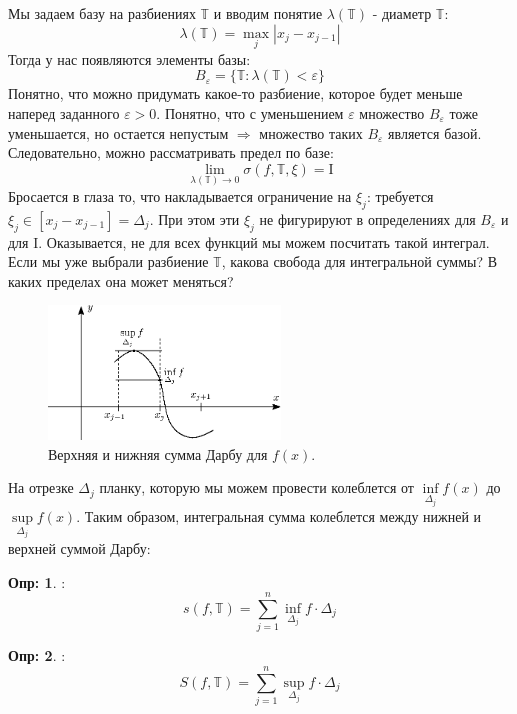 \documentclass[12pt]{article}
\newcommand{\MTB}{\mathbb{T}}
\newcommand{\MI}{\mathrm{I}}
\newcommand{\VE}{\varepsilon}
\theoremstyle{definition}
\newtheorem{defn}{Опр:}
\newcommand{\ddsum}[2]{\displaystyle\sum\limits_{#1}^{#2}}
\begin{document}
Мы задаем базу на разбиениях $\MTB$ и вводим понятие $\lambda(\MTB)$ - диаметр $\MTB$:
$$
	\lambda(\MTB) = \max\limits_{j}|x_j - x_{j-1}|
$$
Тогда у нас появляются элементы базы:
$$
	B_\VE = \{\MTB \colon \lambda{(\MTB)} < \VE\}
$$
Понятно, что можно придумать какое-то разбиение, которое будет меньше наперед заданного $\VE > 0$. Понятно, что с уменьшением $\VE$ множество $B_{\VE}$ тоже уменьшается, но остается непустым $\Rightarrow$ множество таких $B_{\VE}$ является базой. Следовательно, можно рассматривать предел по базе:
$$
	\lim\limits_{\lambda(\MTB) \to 0} \sigma(f,\MTB,\xi) = \MI
$$
Бросается в глаза то, что накладывается ограничение на $\xi_j$: требуется $\xi_j \in [x_{j} - x_{j-1}] = \Delta_j$. При этом эти $\xi_j$ не фигурируют в определениях для $B_\VE$ и для $\MI$. Оказывается, не для всех функций мы можем посчитать такой интеграл. Если мы уже выбрали разбиение $\MTB$, какова свобода для интегральной суммы? В каких пределах она может меняться?
\begin{figure}[H]
	\centering
	\includegraphics[width=0.55\textwidth]{MA2S8_2.eps}
	\caption{Верхняя и нижняя сумма Дарбу для $f(x)$.}
	\label{8_2}
\end{figure}
На отрезке $\Delta_j$ планку, которую мы можем провести колеблется от $\inf\limits_{\Delta_j}f(x)$ до $\sup\limits_{\Delta_j}f(x)$. Таким образом, интегральная сумма колеблется между нижней и верхней суммой Дарбу:
\begin{defn}
	:
	$$
		s(f,\MTB) = \ddsum{j = 1}{n}\inf\limits_{\Delta_j}f{\cdot}\Delta_j
	$$
\end{defn}
\begin{defn}
	:
	$$
		S(f,\MTB) =  \ddsum{j = 1}{n}\sup\limits_{\Delta_j}f{\cdot}\Delta_j
	$$
\end{defn}
\end{document}
